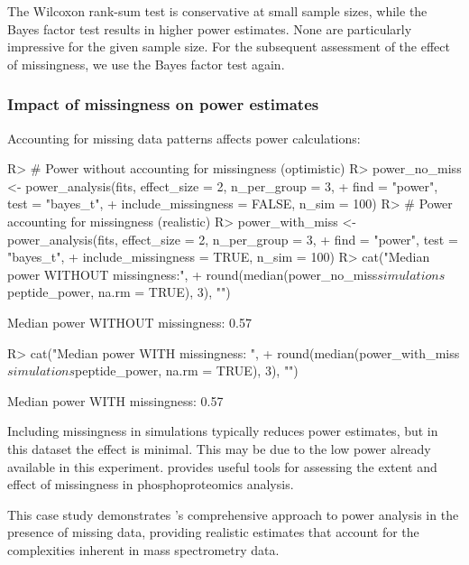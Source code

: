 \documentclass[article]{jss}
\begin{document}
The Wilcoxon rank-sum test is conservative at small sample sizes, while the Bayes factor test results in higher power estimates. None are particularly impressive for the given sample size. For the subsequent assessment of the effect of missingness, we use the Bayes factor test again.

\subsubsection{Impact of missingness on power estimates}

Accounting for missing data patterns affects power calculations:

\begin{Schunk}
\begin{Sinput}
R> # Power without accounting for missingness (optimistic)
R> power_no_miss <- power_analysis(fits, effect_size = 2, n_per_group = 3,
+                                  find = "power", test = "bayes_t",
+                                  include_missingness = FALSE, n_sim = 100)
R> # Power accounting for missingness (realistic)
R> power_with_miss <- power_analysis(fits, effect_size = 2, n_per_group = 3,
+                                    find = "power", test = "bayes_t",
+                                    include_missingness = TRUE, n_sim = 100)
R> cat("Median power WITHOUT missingness:",
+      round(median(power_no_miss$simulations$peptide_power, na.rm = TRUE), 3), "\n")
\end{Sinput}
\begin{Soutput}
Median power WITHOUT missingness: 0.57 
\end{Soutput}
\begin{Sinput}
R> cat("Median power WITH missingness:   ",
+      round(median(power_with_miss$simulations$peptide_power, na.rm = TRUE), 3), "\n")
\end{Sinput}
\begin{Soutput}
Median power WITH missingness:    0.57 
\end{Soutput}
\end{Schunk}

Including missingness in simulations typically reduces power estimates, but in this dataset the effect is minimal. This may be due to the low power already available in this experiment.  provides useful tools for assessing the extent and effect of missingness in phosphoproteomics analysis.


This case study demonstrates 's comprehensive approach to power analysis in the presence of missing data, providing realistic estimates that account for the complexities inherent in mass spectrometry data.
\end{document}
